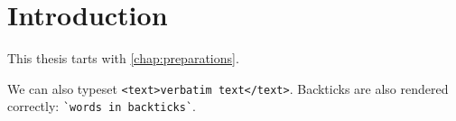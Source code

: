 \chapter{Introduction}

This thesis tarts with \cref{chap:preparations}.

We can also typeset \verb|<text>verbatim text</text>|.
Backticks are also rendered correctly: \verb|`words in backticks`|.
